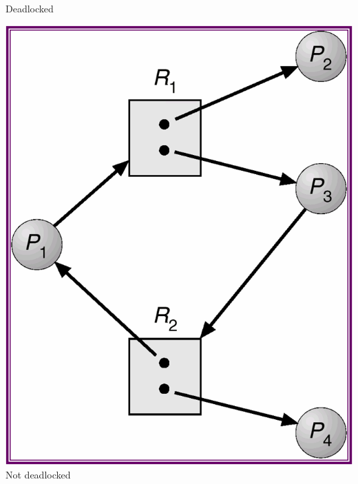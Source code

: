 \documentclass[CJKutf8,xcolor=pdftex,dvipsnames,table]{beamer}
\begin{document}
\begin{CJK*}{UTF8}{song}
\begin{frame}
\begin{minipage}[c]{0.5\textwidth}
    \newline Deadlocked \pause
  \end{minipage}%
  \begin{minipage}[c]{0.5\textwidth}
    \centering
    \includegraphics[scale=.3]{v6f8-3} \pause
    \newline Not deadlocked
  \end{minipage}
  \end{frame}


\end{CJK*}
\end{document}
